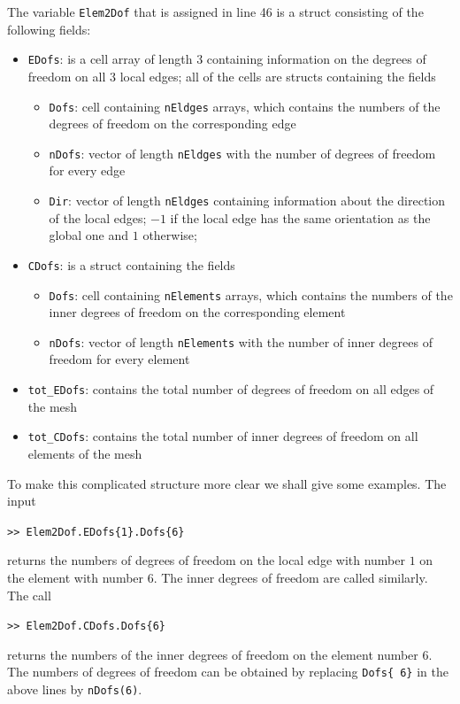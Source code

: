 The variable \texttt{Elem2Dof} that is assigned in line 46 is a struct consisting of the following fields:
\begin{itemize}
 \item \texttt{EDofs}: is a cell array of length 3 containing information on the degrees of freedom on all 3 local edges; all of the cells are structs containing the fields
 \begin{itemize}
  \item \texttt{Dofs}: cell containing \texttt{nEldges} arrays, which contains the numbers of the degrees of freedom on the corresponding edge
  \item \texttt{nDofs}: vector of length \texttt{nEldges} with the number of degrees of freedom for every edge
  \item \texttt{Dir}: vector of length \texttt{nEldges} containing information about the direction of the local edges; $-1$ if the local edge has the same orientation as the global one and $1$ otherwise;
 \end{itemize}
 \item \texttt{CDofs}: is a struct containing the fields
 \begin{itemize}
  \item \texttt{Dofs}: cell containing \texttt{nElements} arrays, which contains the numbers of the inner degrees of freedom on the corresponding element
  \item \texttt{nDofs}: vector of length \texttt{nElements} with the number of inner degrees of freedom for every element
 \end{itemize}
 \item \texttt{tot\_EDofs}: contains the total number of degrees of freedom on all edges of the mesh
 \item \texttt{tot\_CDofs}: contains the total number of inner degrees of freedom on all elements of the mesh
\end{itemize}
To make this complicated structure more clear we shall give some examples. The input

\verb!>> Elem2Dof.EDofs{1}.Dofs{6}!

\noindent returns the numbers of degrees of freedom on the local edge with number $1$ on the element with number $6$. The inner degrees of freedom are called similarly. The call

\verb!>> Elem2Dof.CDofs.Dofs{6}!

\noindent returns the numbers of the inner degrees of freedom on the element number $6$. The numbers of degrees of freedom can be obtained by replacing \texttt{Dofs\{ 6\}} in the above lines by \texttt{nDofs(6)}.


